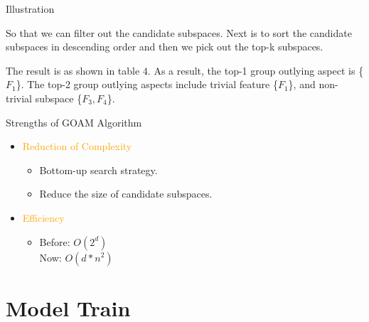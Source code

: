 \documentclass[
 size=14pt,
 paper=smartboard,  %
 mode=present, 		%
 display=slides, 	%
 style=tuliplab,  	%
 pauseslide,
 fleqn,leqno]{powerdot}
\begin{document}
\begin{slide}[toc=,bm=]{Illustration}
\begin{note}
So that we can filter out the candidate subspaces.
Next is to sort the candidate subspaces in
descending order and then we pick out the top-k subspaces.

The result is as shown in table $4$.
As a result,
the top-1 group outlying aspect is \{$F_1$\}.
The top-2 group outlying aspects include
trivial feature \{$F_1$\},
and non-trivial subspace \{$F_3, F_4$\}.
\end{note}

\end{slide}


\begin{slide}[toc=,bm=]{Strengths of GOAM Algorithm}
\begin{itemize}
\item
\textcolor{orange}{Reduction of Complexity}

\begin{itemize}
\item
Bottom-up search strategy.

\item
Reduce the size of candidate subspaces.

\end{itemize}

\item
\textcolor{orange}{Efficiency}

\begin{itemize}
\item
Before: $O(2^d)$  \\
Now:    $O(d*n^{2})$

\end{itemize}
\end{itemize}



\end{slide}


\section{Model Train}
\end{document}
